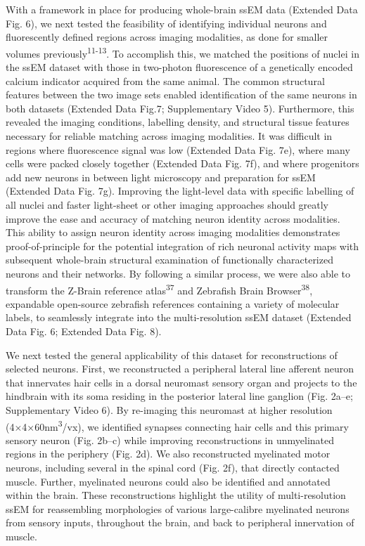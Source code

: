 \documentclass{article}
\begin{document}
With a framework in place for producing whole-brain ssEM data (Extended Data Fig. 6), we next tested the feasibility of identifying individual neurons and fluorescently defined regions across imaging modalities, as done for smaller volumes previously\textsuperscript{11-13}. To accomplish this, we matched the positions of nuclei in the ssEM dataset with those in two-photon fluorescence of a genetically encoded calcium indicator acquired from the same animal. The common structural features between the two image sets enabled identification of the same neurons in both datasets (Extended Data Fig.7; Supplementary Video 5). Furthermore, this revealed the imaging conditions, labelling density, and structural tissue features necessary for reliable matching across imaging modalities. It was difficult in regions where fluorescence signal was low (Extended Data Fig. 7e), where many cells were packed closely together (Extended Data Fig. 7f), and where progenitors add new neurons in between light microscopy and preparation for ssEM (Extended Data Fig. 7g). Improving the light-level data with specific labelling of all nuclei and faster light-sheet or other imaging approaches should greatly improve the ease and accuracy of matching neuron identity across modalities. This ability to assign neuron identity across imaging modalities demonstrates proof-of-principle for the potential integration of rich neuronal activity maps with subsequent whole-brain structural examination of functionally characterized neurons and their networks. By following a similar process, we were also able to transform the Z-Brain reference atlas\textsuperscript{37} and Zebrafish Brain Browser\textsuperscript{38}, expandable open-source zebrafish references containing a variety of molecular labels, to seamlessly integrate into the multi-resolution ssEM dataset (Extended Data Fig. 6; Extended Data Fig. 8).

We next tested the general applicability of this dataset for reconstructions of selected neurons. First, we reconstructed a peripheral lateral line afferent neuron that innervates hair cells in a dorsal neuromast sensory organ and projects to the hindbrain with its soma residing in the posterior lateral line ganglion (Fig. 2a–e; Supplementary Video 6). By re-imaging this neuromast at higher resolution (4×4×60nm\textsuperscript{3}/vx), we identified synapses connecting hair cells and this primary sensory neuron (Fig. 2b–c) while improving reconstructions in unmyelinated regions in the periphery (Fig. 2d). We also reconstructed myelinated motor neurons, including several in the spinal cord (Fig. 2f), that directly contacted muscle. Further, myelinated neurons could also be identified and annotated within the brain. These reconstructions highlight the utility of multi-resolution ssEM for reassembling morphologies of various large-calibre myelinated neurons from sensory inputs, throughout the brain, and back to peripheral innervation of muscle.
\end{document}
